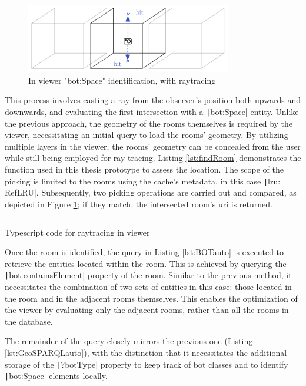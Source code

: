 \begin{figure}[H]
    \centering
    \includegraphics[width=0.8\textwidth]{figures/pdf/inViewer.pdf}
    \caption{In viewer "bot:Space" identification, with raytracing}
    \label{fig:raytrace}
\end{figure}

This process involves casting a ray from the observer's position both upwards and downwards, and evaluating the first intersection with a \texttt|bot:Space| entity. Unlike the previous approach, the geometry of the rooms themselves is required by the viewer, necessitating an initial query to load the rooms' geometry. By utilizing multiple layers in the viewer, the rooms' geometry can be concealed from the user while still being employed for ray tracing. Listing \ref{lst:findRoom} demonstrates the function used in this thesis prototype to assess the location. The scope of the picking is limited to the rooms using the cache's metadata, in this case \texttt|lru: RefLRU|. Subsequently, two picking operations are carried out and compared, as depicted in Figure \ref{fig:raytrace}; if they match, the intersected room's \ac{uri} is returned.

\begin{listing}[h]
    \inputminted{ts}{dynamicQueries/inViewer/raytrace.ts}
    \vspace{-0.7cm}
    \caption{Typescript code for raytracing in viewer}
    \label{lst:findRoom}
\end{listing}

Once the room is identified, the query in Listing \ref{lst:BOTauto} is executed to retrieve the entities located within the room. This is achieved by querying the \texttt|bot:containsElement| property of the room. Similar to the previous method, it necessitates the combination of two sets of entities in this case: those located in the room and in the adjacent rooms themselves. This enables the optimization of the viewer by evaluating only the adjacent rooms, rather than all the rooms in the database.

The remainder of the query closely mirrors the previous one (Listing \ref{lst:GeoSPARQLauto}), with the distinction that it necessitates the additional storage of the \texttt|?botType| property to keep track of \ac{bot} classes and to identify \texttt|bot:Space| elements locally.

